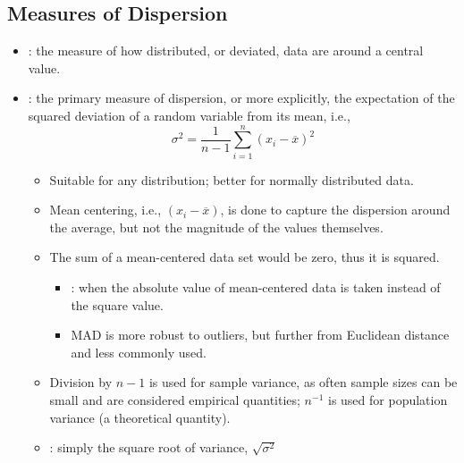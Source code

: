 \begin{itemize}
  \subsection{Measures of Dispersion}
  \begin{itemize}
    \item {}: the measure of how distributed, or deviated, data are around a central value.
    \item {}: the primary measure of dispersion, or more explicitly, the expectation of the squared deviation of a random variable from its mean, i.e.,
    \[%
    \sigma^2 = \frac{1}{n-1}\sum_{i = 1}^{n}(x_i-\overline{x})^2
    \]%
    \begin{itemize}
      \item Suitable for any distribution; better for normally distributed data.
      \item Mean centering, i.e., \((x_i - \overline{x})\), is done to capture the dispersion around the average, but not the magnitude of the values themselves.
      \item The sum of a mean-centered data set would be zero, thus it is squared.
        \begin{itemize}
          \item {}: when the absolute value of mean-centered data is taken instead of the square value. 
          \item MAD is more robust to outliers, but further from Euclidean distance and less commonly used. 
        \end{itemize}
      \item Division by \(n-1\) is used for sample variance, as often sample sizes can be small and are considered empirical quantities; \(n ^{-1}\) is used for population variance (a theoretical quantity).
      \item {}: simply the square root of variance, \(\sqrt{\sigma^2}\)
    \end{itemize}
  \end{itemize}


\end{itemize}
